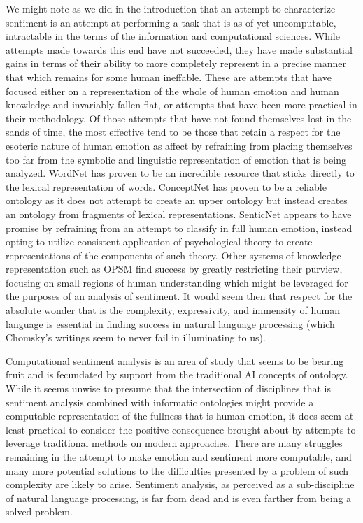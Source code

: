 \documentclass[letterpaper, 10 pt, conference]{ieeeconf}
\begin{document}
We might note as we did in the introduction that an attempt to characterize sentiment is an attempt at performing a task that is as of yet uncomputable, intractable in the terms of the information and computational sciences. While attempts made towards this end have not succeeded, they have made substantial gains in terms of their ability to more completely represent in a precise manner that which remains for some human ineffable. These are attempts that have focused either on a representation of the whole of human emotion and human knowledge and invariably fallen flat, or attempts that have been more practical in their methodology. Of those attempts that have not found themselves lost in the sands of time, the most effective tend to be those that retain a respect for the esoteric nature of human emotion as affect by refraining from placing themselves too far from the symbolic and linguistic representation of emotion that is being analyzed. WordNet has proven to be an incredible resource that sticks directly to the lexical representation of words. ConceptNet has proven to be a reliable ontology as it does not attempt to create an upper ontology but instead creates an ontology from fragments of lexical representations. SenticNet appears to have promise by refraining from an attempt to classify in full human emotion, instead opting to utilize consistent application of psychological theory to create representations of the components of such theory. Other systems of knowledge representation such as OPSM find success by greatly restricting their purview, focusing on small regions of human understanding which might be leveraged for the purposes of an analysis of sentiment. It would seem then that respect for the absolute wonder that is the complexity, expressivity, and immensity of human language is essential in finding success in natural language processing (which Chomsky's writings seem to never fail in illuminating to us).

Computational sentiment analysis is an area of study that seems to be bearing fruit and is fecundated by support from the traditional AI concepts of ontology. While it seems unwise to presume that the intersection of disciplines that is sentiment analysis combined with informatic ontologies might provide a computable representation of the fullness that is human emotion, it does seem at least practical to consider the positive consequence brought about by attempts to leverage traditional methods on modern approaches. There are many struggles remaining in the attempt to make emotion and sentiment more computable, and many more potential solutions to the difficulties presented by a problem of such complexity are likely to arise. Sentiment analysis, as perceived as a sub-discipline of natural language processing, is far from dead and is even farther from being a solved problem.
\end{document}
